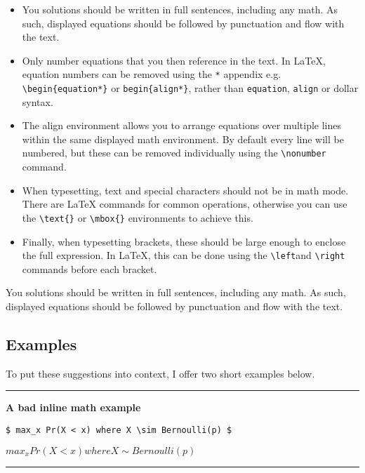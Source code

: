 \documentclass[a4paper, 11pt]{article}
\begin{document}
\begin{itemize}
    \item You solutions should be written in full sentences, including any math. As such, displayed equations should be followed by punctuation and flow with the text.  
    \item Only number equations that you then reference in the text. In LaTeX, equation numbers can be removed using the \verb|*| appendix e.g. \verb|\begin{equation*}|  or \verb|begin{align*}|, rather than \texttt{equation}, \texttt{align} or dollar syntax.  
    \item The align environment allows you to arrange equations over multiple lines within the same displayed math environment. By default every line will be numbered, but these can be removed individually using the \verb|\nonumber| command.   
    \item When typesetting, text and special characters should not be in math mode. There are LaTeX commands for common operations, otherwise you can use the \verb|\text{}| or \verb|\mbox{}| environments to achieve this.  
    \item  Finally, when typesetting brackets, these should be large enough to enclose the full expression. In LaTeX, this can be done using the \verb|\left|and \verb|\right| commands before each bracket.  
    
\end{itemize}
You solutions should be written in full sentences, including any math. As such, displayed equations should be followed by punctuation and flow with the text. 

\subsection{Examples}

To put these suggestions into context, I offer two short examples below. 

\vspace{1em}
\hrule
\vspace{1em}

\textbf{A bad inline math example} 

\verb|$ max_x Pr(X < x) where X \sim Bernoulli(p) $|

$ max_x Pr(X < x) where X \sim Bernoulli(p) $

\vspace{1em}
\hrule
\vspace{1em}
\end{document}
